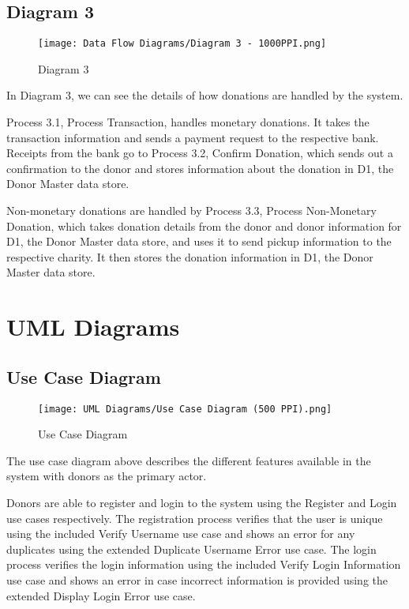 \documentclass{scrreprt}
\begin{document}
    \newpage
    
    \section{Diagram 3}
    
        \begin{figure}[H]
            \centering
            \texttt{[image: Data Flow Diagrams/Diagram 3 - 1000PPI.png]}
            {\caption*{Diagram 3}}
        \end{figure}
        
        In Diagram 3, we can see the details of how donations are handled by the system.\par
        
        Process 3.1, Process Transaction, handles monetary donations. It takes the transaction information and sends a payment request to the respective bank. Receipts from the bank go to Process 3.2, Confirm Donation, which sends out a confirmation to the donor and stores information about the donation in D1, the Donor Master data store.\par
        
        Non-monetary donations are handled by Process 3.3, Process Non-Monetary Donation, which takes donation details from the donor and donor information for D1, the Donor Master data store, and uses it to send pickup information to the respective charity. It then stores the donation information in D1, the Donor Master data store.


\chapter{UML Diagrams}

    \section{Use Case Diagram}
        \begin{figure}[!h]
            \centering
            \texttt{[image: UML Diagrams/Use Case Diagram (500 PPI).png]}
            {\caption*{Use Case Diagram}}
        \end{figure}
    
    The use case diagram above describes the different features available in the system with donors as the primary actor.\par
    
    Donors are able to register and login to the system using the Register and Login use cases respectively. The registration process verifies that the user is unique using the included Verify Username use case and shows an error for any duplicates using the extended Duplicate Username Error use case. The login process verifies the login information using the included Verify Login Information use case and shows an error in case incorrect information is provided using the extended Display Login Error use case.\par
    
\end{document}
